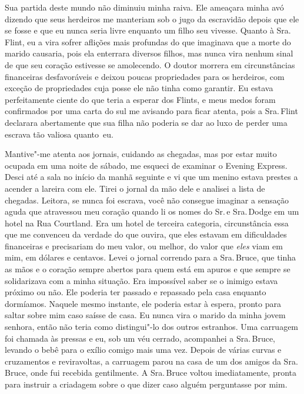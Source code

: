Sua partida deste mundo não diminuiu
minha raiva. Ele ameaçara minha avó dizendo que seus herdeiros me
manteriam sob o jugo da escravidão depois que ele se fosse e que eu
nunca seria livre enquanto um filho seu vivesse. Quanto à Sra.\,Flint, eu
a vira sofrer aflições mais profundas do que imaginava que a morte do
marido causaria, pois ela enterrara diversos filhos, mas nunca vira
nenhum sinal de que seu coração estivesse se amolecendo. O doutor
morrera em circunstâncias financeiras desfavoráveis e deixou poucas
propriedades para os herdeiros, com exceção de propriedades cuja posse
ele não tinha como garantir. Eu estava perfeitamente ciente do que teria
a esperar dos Flints, e meus medos foram confirmados por uma carta do
sul me avisando para ficar atenta, pois a Sra.\,Flint declarara
abertamente que sua filha não poderia se dar ao luxo de perder uma
escrava tão valiosa quanto~eu.

Mantive"-me atenta aos jornais, cuidando
as chegadas, mas por estar muito ocupada em uma noite de sábado, me
esqueci de examinar o Evening Express. Desci até a sala no início da
manhã seguinte e vi que um menino estava prestes a acender a lareira com
ele. Tirei o jornal da mão dele e analisei a lista de chegadas. Leitora,
se nunca foi escrava, você não consegue imaginar a sensação aguda que
atravessou meu coração quando li os nomes do Sr.\,e Sra.\,Dodge em um
hotel na Rua Courtland. Era um hotel de terceira categoria,
circunstância essa que me convenceu da verdade do que ouvira, que eles
estavam em dificuldades financeiras e precisariam do meu valor, ou
melhor, do valor que \emph{eles} viam em mim, em dólares e centavos.
Levei o jornal correndo para a Sra.\,Bruce, que tinha as mãos e o coração
sempre abertos para quem está em apuros e que sempre se solidarizava com
a minha situação. Era impossível saber se o inimigo estava próximo ou
não. Ele poderia ter passado e repassado pela casa enquanto dormíamos.
Naquele mesmo instante, ele poderia estar à espera, pronto para saltar
sobre mim caso saísse de casa. Eu nunca vira o marido da minha jovem
senhora, então não teria como distingui"-lo dos outros estranhos. Uma
carruagem foi chamada às pressas e eu, sob um véu cerrado, acompanhei a
Sra.\,Bruce, levando o bebê para o exílio comigo mais uma vez. Depois de
várias curvas e cruzamentos e reviravoltas, a carruagem parou na casa de
um dos amigos da Sra.\,Bruce, onde fui recebida gentilmente. A Sra.\,Bruce
voltou imediatamente, pronta para instruir a criadagem sobre o que dizer
caso alguém perguntasse por mim.

